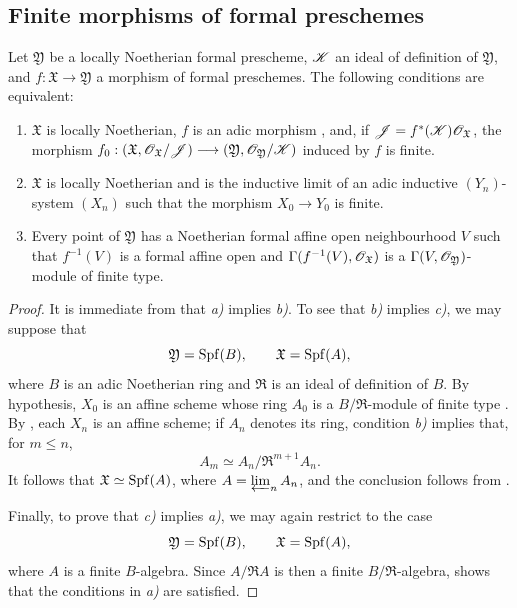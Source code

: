\subsection{Finite morphisms of formal preschemes}
\label{subsection:III.4.8}

\begin{proposition}[4.8.1]
\label{III.4.8.1}
Let $\mathfrak{Y}$ be a locally Noetherian formal prescheme,
$\mathscr{K}$ an ideal of definition of $\mathfrak{Y}$, and
$f:\mathfrak{X}\to\mathfrak{Y}$ a morphism of formal preschemes.
The following conditions are equivalent:
\begin{enumerate}
  \item[\rm{a)}] $\mathfrak{X}$ is locally Noetherian, $f$ is an
    adic morphism , and, if
    $\mathscr{J}=f^*(\mathscr{K})\mathscr{O}_{\mathfrak{X}}$, the morphism $f_0:
(\mathfrak{X},\mathscr{O}_{\mathfrak{X}}/\mathscr{J})
\longrightarrow
(\mathfrak{Y},\mathscr{O}_{\mathfrak{Y}}/\mathscr{K})$
    induced by $f$ is finite.
  \item[\rm{b)}] $\mathfrak{X}$ is locally Noetherian and is the
    inductive limit of an adic inductive $(Y_n)$-system $(X_n)$
    such that the morphism $X_0\to Y_0$ is finite.
  \item[\rm{c)}] Every point of $\mathfrak{Y}$ has a Noetherian
    formal affine open neighbourhood $V$ such that $f^{-1}(V)$ is
    a formal affine open and
    $\Gamma(f^{-1}(V),\mathscr{O}_{\mathfrak{X}})$ is a
    $\Gamma(V,\mathscr{O}_{\mathfrak{Y}})$-module of finite type.
\end{enumerate}
\end{proposition}

\begin{proof}
It is immediate from  that \emph{a)} implies
\emph{b)}.  To see that \emph{b)} implies \emph{c)}, we may suppose
that
\[
  \mathfrak{Y}=\operatorname{Spf}(B),\qquad \mathfrak{X}=\operatorname{Spf}(A),
\]
where $B$ is an adic Noetherian ring and $\mathfrak{R}$ is an ideal
of definition of $B$.  By hypothesis, $X_0$ is an affine scheme
whose ring $A_0$ is a $B/\mathfrak{R}$-module of finite type
.  By , each $X_n$ is an affine
scheme; if $A_n$ denotes its ring, condition \emph{b)} implies that,
for $m\leq n$,
\[
  A_m\simeq A_n/\mathfrak{R}^{m+1}A_n.
\]
It follows that $\mathfrak{X}\simeq\operatorname{Spf}(A)$, where
$A=\varprojlim_n A_n$, and the conclusion follows from
.

Finally, to prove that \emph{c)} implies \emph{a)}, we may again
restrict to the case
\[
  \mathfrak{Y}=\operatorname{Spf}(B),\qquad \mathfrak{X}=\operatorname{Spf}(A),
\]
where $A$ is a finite $B$-algebra.  Since
$A/\mathfrak{R}A$ is then a finite
$B/\mathfrak{R}$-algebra,  shows that the
conditions in \emph{a)} are satisfied.
\end{proof}


